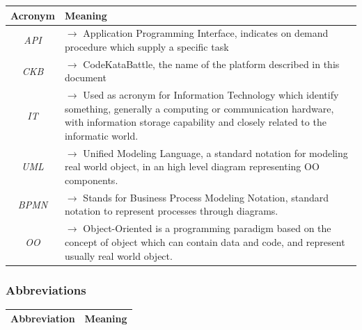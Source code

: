 \documentclass{article}
\begin{document}
{\begin{xltabular}{\textwidth}{ >{\raggedright\arraybackslash}c >{\raggedright\arraybackslash}X }
            \endfirsthead

            \hline 
            \textbf{Acronym} & \textbf{Meaning} \\
            \hline 

            \endhead
            \endfoot
            \endlastfoot

            \textit{API} & $\rightarrow$ Application Programming Interface, indicates on demand procedure which supply a specific task
            \\
            \textit{CKB} & $\rightarrow$ CodeKataBattle, the name of the platform described in this document
            \\
            \textit{IT} & $\rightarrow$ Used as acronym for Information Technology which identify something, generally a computing or communication hardware, with information storage capability and closely related to the informatic world.
            \\
            \textit{UML} & $\rightarrow$ Unified Modeling Language, a standard notation for modeling real world object, in an high level diagram representing OO components.
            \\
            \textit{BPMN} & $\rightarrow$ Stands for Business Process Modeling Notation, standard notation to represent processes through diagrams.  
            \\
            \textit{OO} & $\rightarrow$ Object-Oriented is a programming paradigm based on the concept of object which can contain data and code, and represent usually real world object.
            
        \end{xltabular}
        
    \subsubsection{Abbreviations}
       \begin{xltabular}{\textwidth}{ >{\raggedright\arraybackslash}c >{\raggedright\arraybackslash}X }
            \hline 
            \textbf{Abbreviation} & \textbf{Meaning} \\
            \hline 
                

\end{xltabular}}
\end{document}

